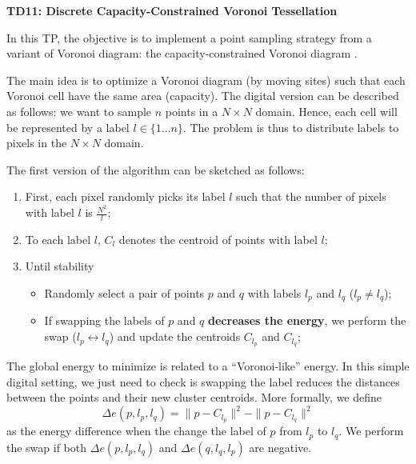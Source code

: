 \documentclass[a4paper, 11pt]{article}
\title{}
\author{}
\date{}
\begin{document}
\begin{center}
	\LARGE \textbf{TD11: Discrete Capacity-Constrained Voronoi Tessellation}
\end{center}

\bigskip
\par In this TP, the objective is to implement a point sampling
strategy from a variant of Voronoi diagram: the capacity-constrained
Voronoi diagram
\cite{BalzerHeck:2008:CCVDIFS,Balzer.etal:2009:CCPDAVoLM}.

The main idea is to optimize a Voronoi diagram (by moving sites) such
that each Voronoi cell have the same area (capacity).  The digital
version can be described as follows: we want to sample $n$ points in a
$N\times N$ domain. Hence, each cell will be represented by a label
$l\in\{1\ldots n\}$. The problem is thus to distribute labels to
pixels in the $N\times N$ domain.

The first version of the algorithm can be sketched as follows:

\begin{enumerate}
\item First, each pixel randomly picks its label $l$ such that the
  number of pixels with label $l$ is  $\frac{N^2}{l}$;
\item To each label $l$, $C_l$ denotes the centroid of points with
  label $l$;

\item Until stability
  \begin{itemize}
  \item Randomly select a pair of points $p$ and $q$ with
    labels $l_p$ and $l_q$ ($l_p\neq l_q$);
  \item If swapping the labels of $p$ and $q$ \textbf{decreases the
    energy}, we perform the swap  ($l_p\leftrightarrow l_q$) and
    update the centroids $C_{l_p}$ and $C_{l_q}$;
  \end{itemize}
\end{enumerate}

The global energy to minimize is related to a ``Voronoi-like''
energy. In this simple digital setting, we just need to check is
swapping the label reduces the distances between the points and their
new cluster centroids.
More formally, we define
\begin{displaymath}
  \Delta e(p,l_p,l_q) = \|p-C_{l_p}\|^2 - \|p-C_{l_q}\|^2
\end{displaymath}
as the energy difference when the change the label of $p$ from $l_p$
to $l_q$. We perform the swap if both $\Delta e(p,l_p,l_q)$ and $\Delta
e(q,l_q,l_p)$ are negative.
\end{document}

